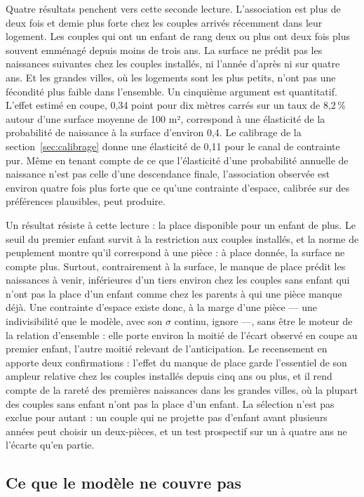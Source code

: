 \documentclass[11pt,a4paper]{article}
\theoremstyle{plain}
\theoremstyle{definition}
\theoremstyle{remark}
\begin{document}
Quatre résultats penchent vers cette seconde lecture. L'association est plus de deux fois et demie plus forte chez les couples arrivés récemment dans leur logement. Les couples qui ont un enfant de rang deux ou plus ont deux fois plus souvent emménagé depuis moins de trois ans. La surface ne prédit pas les naissances suivantes chez les couples installés, ni l'année d'après ni sur quatre ans. Et les grandes villes, où les logements sont les plus petits, n'ont pas une fécondité plus faible dans l'ensemble. Un cinquième argument est quantitatif. L'effet estimé en coupe, 0,34 point pour dix mètres carrés sur un taux de 8,2\,\% autour d'une surface moyenne de 100 m², correspond à une élasticité de la probabilité de naissance à la surface d'environ 0,4. Le calibrage de la section~\ref{sec:calibrage} donne une élasticité de 0,11 pour le canal de contrainte pur. Même en tenant compte de ce que l'élasticité d'une probabilité annuelle de naissance n'est pas celle d'une descendance finale, l'association observée est environ quatre fois plus forte que ce qu'une contrainte d'espace, calibrée sur des préférences plausibles, peut produire.

Un résultat résiste à cette lecture : la place disponible pour un enfant de plus. Le seuil du premier enfant survit à la restriction aux couples installés, et la norme de peuplement montre qu'il correspond à une pièce : à place donnée, la surface ne compte plus. Surtout, contrairement à la surface, le manque de place prédit les naissances à venir, inférieures d'un tiers environ chez les couples sans enfant qui n'ont pas la place d'un enfant comme chez les parents à qui une pièce manque déjà. Une contrainte d'espace existe donc, à la marge d'une pièce — une indivisibilité que le modèle, avec son $\sigma$ continu, ignore —, sans être le moteur de la relation d'ensemble : elle porte environ la moitié de l'écart observé en coupe au premier enfant, l'autre moitié relevant de l'anticipation. Le recensement en apporte deux confirmations : l'effet du manque de place garde l'essentiel de son ampleur relative chez les couples installés depuis cinq ans ou plus, et il rend compte de la rareté des premières naissances dans les grandes villes, où la plupart des couples sans enfant n'ont pas la place d'un enfant. La sélection n'est pas exclue pour autant : un couple qui ne projette pas d'enfant avant plusieurs années peut choisir un deux-pièces, et un test prospectif sur un à quatre ans ne l'écarte qu'en partie.

\subsection{Ce que le modèle ne couvre pas}
\end{document}
